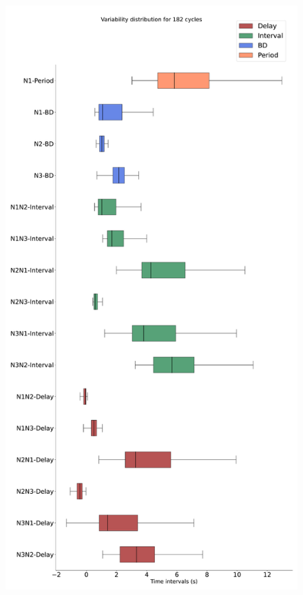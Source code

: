 \begin{figure}[htbp]
\begin{minipage}{0.9\textwidth}
\begin{minipage}[b]{0.45\textwidth}
			\includegraphics[width=\textwidth]{./invariants/data/SUSSEX/prep1/images/spontaneous_boxplot.pdf}
		\end{minipage}
		\begin{minipage}[b]{0.53\textwidth}
			\centering

\end{minipage}
\end{minipage}
\end{figure}
